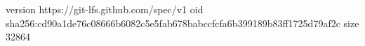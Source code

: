 version https://git-lfs.github.com/spec/v1
oid sha256:cd90a1de76c08666b6082c5e5fab678babccfcfa6b399189b83ff1725d79af2c
size 32864
